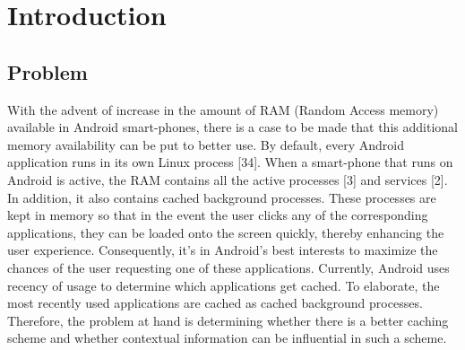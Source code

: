 \documentclass[12pt]{uthesis-v12}  %
\begin{document}

\chapter{Introduction}
	
	\section{Problem}
		With the advent of increase in the amount of RAM (Random Access memory) available in Android smart-phones, there is a case to be made that this additional memory availability can be put to better use. By default, every Android application runs in its own Linux process [34]. When a smart-phone that runs on Android is active, the RAM contains all the active processes [3] and services [2]. In addition, it also contains cached background processes. These processes are kept in memory so that in the event the user clicks any of the corresponding applications, they can be loaded onto the screen quickly, thereby enhancing the user experience. Consequently, it's in Android's best interests to maximize the chances of the user requesting one of these applications. Currently, Android uses recency of usage to determine which applications get cached. To elaborate, the most recently used applications are cached as cached background processes. Therefore, the problem at hand is determining whether there is a better caching scheme and whether contextual information can be influential in such a scheme.
		
\end{document}
